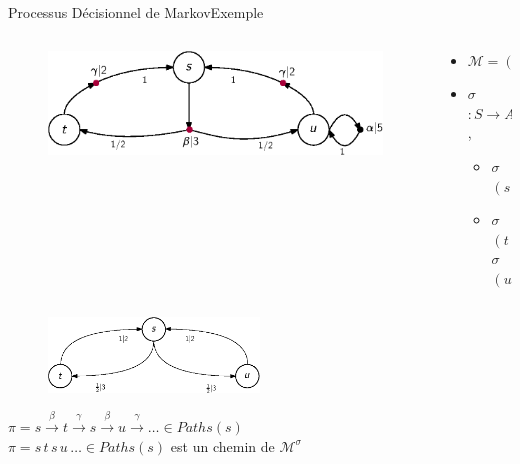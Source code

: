 \documentclass[compress]{beamer}
\begin{document}
\begin{frame}{Processus Décisionnel de Markov}{Exemple}
  \footnotesize
      \begin{columns}
        \begin{column}[t]{0.5\textwidth}
          \begin{figure}
            \includegraphics[width=\linewidth]{resources/strat-simple-pdm}
          \end{figure}
        \end{column}
        \begin{column}[t]{0.5\textwidth}
          \begin{itemize}
            \item $\mathcal{M} = (S, A, \Delta, w)$
            \item {\color{fibeamer@orange}$\sigma$}$: S \rightarrow A$,
            \begin{itemize}
              \item {\color{fibeamer@orange}$\sigma$}$(s)=\beta$
              \item {\color{fibeamer@orange}$\sigma$}$(t)=${\color{fibeamer@orange}$\sigma$}$(u) = \gamma$
            \end{itemize}
          \end{itemize}
        \end{column}
      \end{columns}
        \begin{figure}
          \includegraphics[width=0.5\textwidth]{resources/inducted-markov1}
        \end{figure}
      \begin{center}
    	$ \pi = s \xrightarrow{\beta} t \xrightarrow{\gamma} s \xrightarrow{\beta} u \xrightarrow{\gamma}\dots \in Paths(s)$ \\
        $\pi = s\,t\,s\,u\,{\dots} \in Paths(s)$ est un chemin de {\color{fibeamer@orange}$\mathcal{M}^\sigma$}
      \end{center}
\end{frame}
\end{document}
